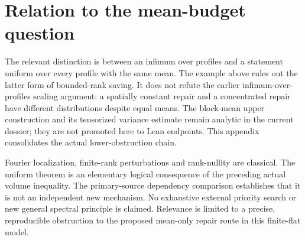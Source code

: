 \documentclass[11pt]{article}
\begin{document}
\section{Relation to the mean-budget question}
The relevant distinction is between an infimum over profiles and a statement
uniform over every profile with the same mean. The example above rules out
the latter form of bounded-rank saving. It does not refute the earlier
infimum-over-profiles scaling argument: a spatially constant repair and a
concentrated repair have different distributions despite equal means.
The block-mean upper construction and its tensorized variance estimate
remain analytic in the current dossier; they are not promoted here to Lean
endpoints. This appendix consolidates the actual lower-obstruction chain.

Fourier localization, finite-rank perturbations and rank-nullity are
classical. The uniform theorem is an elementary logical consequence of
the preceding actual volume inequality. The primary-source dependency
comparison establishes that it is not an independent new mechanism.
No exhaustive external priority search or new general spectral principle
is claimed. Relevance is limited to a precise, reproducible obstruction to
the proposed mean-only repair route in this finite-flat model.
\end{document}
